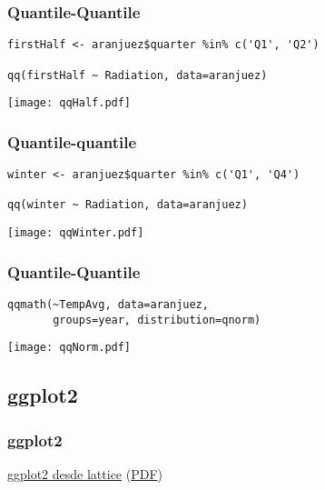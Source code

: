 \documentclass[xcolor={usenames,svgnames,dvipsnames}]{beamer}
\begin{document}
\begin{frame}[fragile]
\frametitle{Quantile-Quantile}
\label{sec-2-1-21}


\lstset{language=R}
\begin{lstlisting}
firstHalf <- aranjuez$quarter %in% c('Q1', 'Q2')

qq(firstHalf ~ Radiation, data=aranjuez)
\end{lstlisting}

\texttt{[image: qqHalf.pdf]}
\end{frame}
\begin{frame}[fragile]
\frametitle{Quantile-quantile}
\label{sec-2-1-22}


\lstset{language=R}
\begin{lstlisting}
winter <- aranjuez$quarter %in% c('Q1', 'Q4')

qq(winter ~ Radiation, data=aranjuez)
\end{lstlisting}

\texttt{[image: qqWinter.pdf]}
\end{frame}
\begin{frame}[fragile]
\frametitle{Quantile-Quantile}
\label{sec-2-1-23}


\lstset{language=R}
\begin{lstlisting}
qqmath(~TempAvg, data=aranjuez,
       groups=year, distribution=qnorm)
\end{lstlisting}

\texttt{[image: qqNorm.pdf]}
\end{frame}
\subsection{ggplot2}
\label{sec-2-2}
\begin{frame}
\frametitle{ggplot2}
\label{sec-2-2-1}


\href{http://learnr.wordpress.com/2009/06/28/ggplot2-version-of-figures-in-lattice-multivariate-data-visualization-with-r-part-1/}{ggplot2 desde lattice} (\href{http://learnr.files.wordpress.com/2009/08/latbook.pdf}{PDF})
\end{frame}
\end{document}
